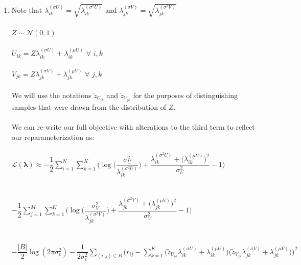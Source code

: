 \documentclass[submit]{harvardml}
\newcommand{\N}{\mathcal{N}}
\theoremstyle{plain}
\begin{document}
\begin{enumerate}[label=2.\arabic*.]
\item Note that $\lambda_{ik}^{(\sigma U)}=\sqrt{\lambda_{ik}^{(\sigma^2U)}}$ and $\lambda_{jk}^{(\sigma V)}=\sqrt{\lambda_{jk}^{(\sigma^2V)}}$\\\\
$Z\sim\N(0,1)$\\\\
$U_{ik}=Z\lambda_{ik}^{(\sigma U)}+\lambda_{ik}^{(\mu U)}$ $\forall$ $i,k$\\\\
$V_{jk}=Z\lambda_{jk}^{(\sigma V)}+\lambda_{jk}^{(\mu V)}$ $\forall$ $j,k$\\\\
We will use the notations $\tilde{z}_{U_{ik}}$ and $\tilde{z}_{V_{jk}}$ for the purposes of distinguishing samples that were drawn from the distribution of $Z$.\\\\
We can re-write our full objective with alterations to the third term to reflect our reparameterization as:\\\\
$\mathcal{L}(\bm{\lambda})\approx-\dfrac{1}{2}\displaystyle\sum_{i=1}^N\displaystyle\sum_{k=1}^K\Bigg(\log\Bigg(\dfrac{\sigma_U^2}{\lambda_{ik}^{(\sigma^2U)}}\Bigg)+\dfrac{\lambda_{ik}^{(\sigma^2U)}+\Big(\lambda_{ik}^{(\mu U)}\Big)^2}{\sigma_U^2}-1\Bigg)$\\\\\\
$-\dfrac{1}{2}\displaystyle\sum_{j=1}^M\displaystyle\sum_{k=1}^K\Bigg(\log\Bigg(\dfrac{\sigma_V^2}{\lambda_{jk}^{(\sigma^2V)}}\Bigg)+\dfrac{\lambda_{jk}^{(\sigma^2V)}+\Big(\lambda_{jk}^{(\mu V)}\Big)^2}{\sigma_V^2}-1\Bigg)$\\\\\\
$-\dfrac{|B|}{2}\log(2\pi\sigma_{\epsilon}^2)-\dfrac{1}{2\sigma_{\epsilon}^2}\displaystyle\sum_{(i,j)\in B}\bigg(r_{ij}-\displaystyle\sum_{k=1}^K\Big(\tilde{z}_{U_{ik}}\lambda_{ik}^{(\sigma U)}+\lambda_{ik}^{(\mu U)}\Big)\Big(\tilde{z}_{V_{jk}}\lambda_{jk}^{(\sigma V)}+\lambda_{jk}^{(\mu V)}\Big)\bigg)^2$
\end{enumerate}
\end{document}

